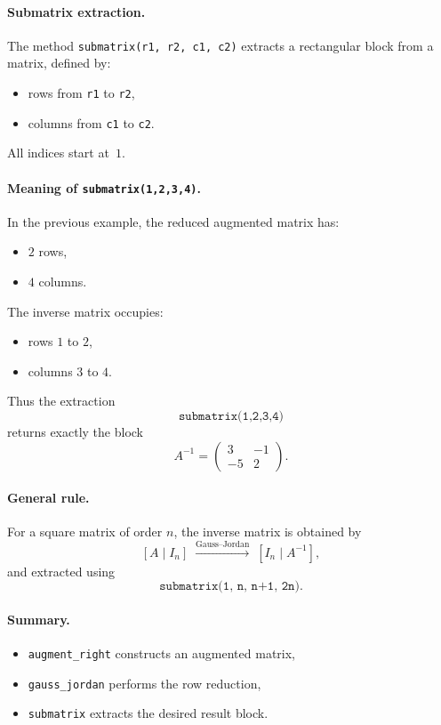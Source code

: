 \medskip

\paragraph{Submatrix extraction.}
The method \texttt{submatrix(r1, r2, c1, c2)} extracts a rectangular block from a
matrix, defined by:

\begin{itemize}
  \item rows from \texttt{r1} to \texttt{r2},
  \item columns from \texttt{c1} to \texttt{c2}.
\end{itemize}

All indices start at~$1$.

\medskip

\paragraph{Meaning of \texttt{submatrix(1,2,3,4)}.}
In the previous example, the reduced augmented matrix has:
\begin{itemize}
  \item $2$ rows,
  \item $4$ columns.
\end{itemize}

The inverse matrix occupies:
\begin{itemize}
  \item rows $1$ to $2$,
  \item columns $3$ to $4$.
\end{itemize}

Thus the extraction
\[
\texttt{submatrix(1,2,3,4)}
\]
returns exactly the block
\[
A^{-1} =
\begin{pmatrix}
3 & -1\\
-5 & 2
\end{pmatrix}.
\]

\medskip

\paragraph{General rule.}
For a square matrix of order $n$, the inverse matrix is obtained by
\[
[A \mid I_n]
\;\xrightarrow{\text{Gauss--Jordan}}\;
[I_n \mid A^{-1}],
\]
and extracted using
\[
\texttt{submatrix(1, n, n+1, 2n)}.
\]

\medskip

\paragraph{Summary.}
\begin{itemize}
  \item \texttt{augment\_right} constructs an augmented matrix,
  \item \texttt{gauss\_jordan} performs the row reduction,
  \item \texttt{submatrix} extracts the desired result block.
\end{itemize}

\endinput
